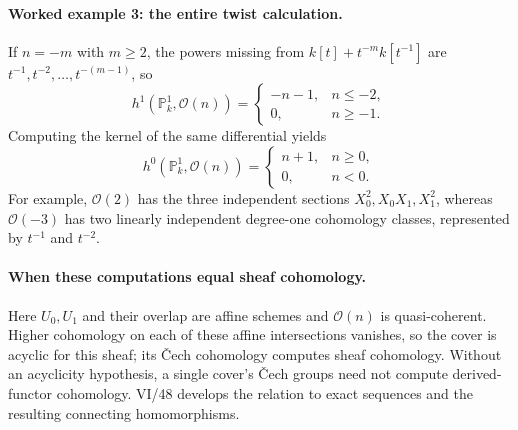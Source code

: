 \paragraph{Worked example 3: the entire twist calculation.}
If $n=-m$ with $m\geq2$, the powers missing from
$k[t]+t^{-m}k[t^{-1}]$ are
$t^{-1},t^{-2},\ldots,t^{-(m-1)}$, so
\[
 h^1(\mathbb P^1_k,\mathcal O(n))=
 \begin{cases}
   -n-1,&n\leq-2,\\
   0,&n\geq-1.
 \end{cases}
\]
Computing the kernel of the same differential yields
\[
 h^0(\mathbb P^1_k,\mathcal O(n))=
 \begin{cases}n+1,&n\geq0,\\0,&n<0.\end{cases}
\]
For example, $\mathcal O(2)$ has the three independent
sections $X_0^2,X_0X_1,X_1^2$, whereas $\mathcal O(-3)$ has
two linearly independent degree-one cohomology classes,
represented by $t^{-1}$ and $t^{-2}$.

\paragraph{When these computations equal sheaf cohomology.}
Here $U_0,U_1$ and their overlap are affine schemes and
$\mathcal O(n)$ is quasi-coherent.  Higher cohomology on each
of these affine intersections vanishes, so the cover is acyclic
for this sheaf; its \v{C}ech cohomology computes sheaf
cohomology.  Without an acyclicity hypothesis, a single cover's
\v{C}ech groups need not compute derived-functor cohomology.
VI/48 develops the relation to exact sequences and the
resulting connecting homomorphisms.
